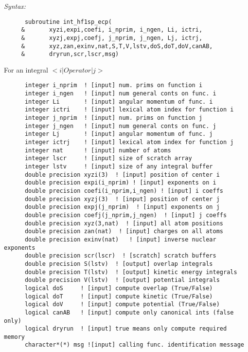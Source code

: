 {\it Syntax:} 
\begin{verbatim} 
      subroutine int_hf1sp_ecp( 
     &       xyzi,expi,coefi, i_nprim, i_ngen, Li, ictri, 
     &       xyzj,expj,coefj, j_nprim, j_ngen, Lj, ictrj, 
     &       xyz,zan,exinv,nat,S,T,V,lstv,doS,doT,doV,canAB, 
     &       dryrun,scr,lscr,msg) 
\end{verbatim} 
For an integral $<i|Operator|j>$ 
\begin{verbatim} 
      integer i_nprim  ! [input] num. prims on function i 
      integer i_ngen   ! [input] num general conts on func. i 
      integer Li       ! [input] angular momentum of func. i   
      integer ictri    ! [input] lexical atom index for function i  
      integer j_nprim  ! [input] num. prims on function j      
      integer j_ngen   ! [input] num general conts on func. j  
      integer Lj       ! [input] angular momentum of func. j   
      integer ictrj    ! [input] lexical atom index for function j  
      integer nat      ! [input] number of atoms 
      integer lscr     ! [input] size of scratch array 
      integer lstv     ! [input] size of any integral buffer 
      double precision xyzi(3)  ! [input] position of center i 
      double precision expi(i_nprim) ! [input] exponents on i 
      double precision coefi(i_nprim,i_ngen) ! [input] i coeffs 
      double precision xyzj(3)  ! [input] position of center j 
      double precision expj(j_nprim)  ! [input] exponents on j 
      double precision coefj(j_nprim,j_ngen)  ! [input] j coeffs 
      double precision xyz(3,nat)  ! [input] all atom positions 
      double precision zan(nat)  ! [input] charges on all atoms 
      double precision exinv(nat)   ! [input] inverse nuclear exponents 
      double precision scr(lscr)  ! [scratch] scratch buffers 
      double precision S(lstv)  ! [output] overlap integrals 
      double precision T(lstv)  ! [output] kinetic energy integrals 
      double precision V(lstv)  ! [output] potential integrals 
      logical doS     ! [input] compute overlap (True/False) 
      logical doT     ! [input] compute kinetic (True/False) 
      logical doV     ! [input] compute potential (True/False) 
      logical canAB   ! [input] compute only canonical ints (false only) 
      logical dryrun  ! [input] true means only compute required memory 
      character*(*) msg ![input] calling func. identification message 
\end{verbatim} 
